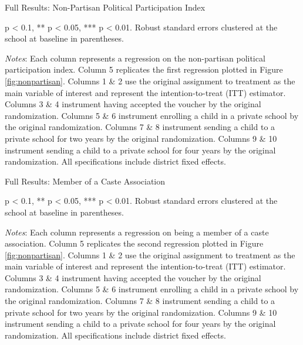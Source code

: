 \documentclass[hidelinks, 12pt, titlepage]{article}
\begin{document}
				\begin{landscape}

					\begin{table}
						\begin{threeparttable}
							\centering
							\caption{Full Results: Non-Partisan Political Participation Index\label{table:appendixnonpartisanpoliticalparticipation}}
							
							\begin{tablenotes}
								\item * p < 0.1, ** p < 0.05, *** p < 0.01. Robust standard errors clustered at the school at baseline in parentheses.
								\item \emph{Notes}: Each column represents a regression on the non-partisan political participation index.  Column 5 replicates the first regression plotted in Figure \ref{fig:nonpartisan}.  Columns 1 \& 2 use the original assignment to treatment as the main variable of interest and represent the intention-to-treat (ITT) estimator.  Columns 3 \& 4 instrument having accepted the voucher by the original randomization.  Columns 5 \& 6 instrument enrolling a child in a private school by the original randomization.  Columns 7 \& 8 instrument sending a child to a private school for two years by the original randomization.  Columns 9 \& 10 instrument sending a child to a private school for four years by the original randomization.  All specifications include district fixed effects.
							\end{tablenotes}
						\end{threeparttable}
					\end{table}

					\clearpage

					\begin{table}
						\begin{threeparttable}
							\centering
							\caption{Full Results: Member of a Caste Association\label{table:appendixcasteassociation}}
							
							\begin{tablenotes}
								\item * p < 0.1, ** p < 0.05, *** p < 0.01. Robust standard errors clustered at the school at baseline in parentheses.
								\item \emph{Notes}: Each column represents a regression on being a member of a caste association.  Column 5 replicates the second regression plotted in Figure \ref{fig:nonpartisan}.  Columns 1 \& 2 use the original assignment to treatment as the main variable of interest and represent the intention-to-treat (ITT) estimator.  Columns 3 \& 4 instrument having accepted the voucher by the original randomization.  Columns 5 \& 6 instrument enrolling a child in a private school by the original randomization.  Columns 7 \& 8 instrument sending a child to a private school for two years by the original randomization.  Columns 9 \& 10 instrument sending a child to a private school for four years by the original randomization.  All specifications include district fixed effects.
							\end{tablenotes}
						\end{threeparttable}
					\end{table}


\end{landscape}
\end{document}
